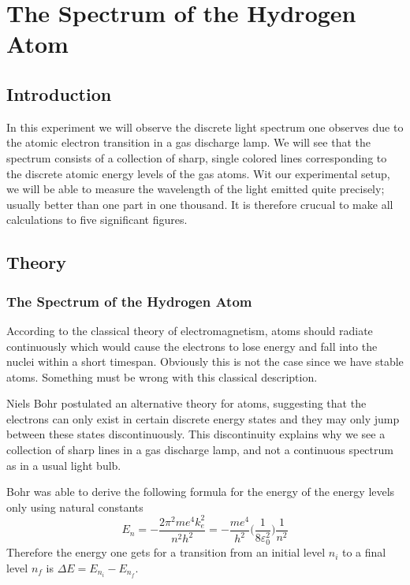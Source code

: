 \chapter{The Spectrum of the Hydrogen Atom}
\section{Introduction}
In this experiment we will observe the discrete light spectrum one observes due to the atomic electron transition in a gas discharge lamp. We will see that the spectrum consists of a collection of sharp, single colored lines corresponding to the discrete atomic energy levels of the gas atoms. Wit our experimental setup, we will be able to measure the wavelength of the light emitted quite precisely; usually better than one part in one thousand. It is therefore crucual to make all calculations to five  significant figures.

\section{Theory}
\subsection{The Spectrum of the Hydrogen Atom}
According to the classical theory of electromagnetism, atoms should radiate continuously which would cause the electrons to lose energy and fall into the nuclei within a short timespan. Obviously this is not the case since we have stable atoms. Something must be wrong with this classical description.\myskip

Niels Bohr postulated an alternative theory for atoms, suggesting that the electrons can only exist in certain discrete energy states and they may only jump between these states discontinuously. This discontinuity explains why we see a collection of sharp lines in a gas discharge lamp, and not a continuous spectrum as in a usual light bulb. \myskip

Bohr was able to derive the following formula for the energy of the energy levels only using natural constants
\begin{equation}
  E_{n}=-\frac{2\pi^2 me^4k^{2}_{e}}{n^2h^2}=-\frac{me^4}{h^2}\bigg(\frac{1}{8\varepsilon^{2}_{0}}\bigg)\frac{1}{n^2}
\end{equation}
Therefore the energy one gets for a transition from an initial level $n_i$ to a final level $n_f$ is $\Delta E = E_{n_{i}} - E_{n_{f}}$.\myskip

